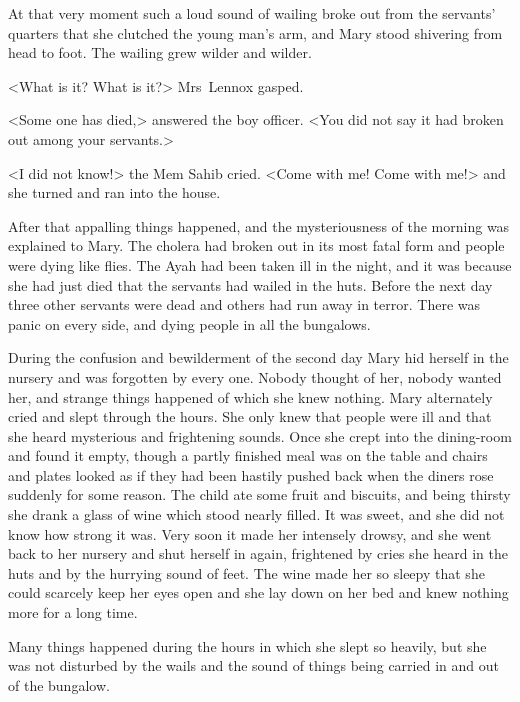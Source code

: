 At that very moment such a loud sound of wailing broke out from the servants' quarters that she clutched the young man's arm, and Mary stood shivering from head to foot. The wailing grew wilder and wilder.

<What is it? What is it?> Mrs~Lennox gasped.

<Some one has died,> answered the boy officer. <You did not say it had broken out among your servants.>

<I did not know!> the Mem Sahib cried. <Come with me! Come with me!> and she turned and ran into the house.

After that appalling things happened, and the mysteriousness of the morning was explained to Mary. The cholera had broken out in its most fatal form and people were dying like flies. The Ayah had been taken ill in the night, and it was because she had just died that the servants had wailed in the huts. Before the next day three other servants were dead and others had run away in terror. There was panic on every side, and dying people in all the bungalows.

During the confusion and bewilderment of the second day Mary hid herself in the nursery and was forgotten by every one. Nobody thought of her, nobody wanted her, and strange things happened of which she knew nothing. Mary alternately cried and slept through the hours. She only knew that people were ill and that she heard mysterious and frightening sounds. Once she crept into the dining-room and found it empty, though a partly finished meal was on the table and chairs and plates looked as if they had been hastily pushed back when the diners rose suddenly for some reason. The child ate some fruit and biscuits, and being thirsty she drank a glass of wine which stood nearly filled. It was sweet, and she did not know how strong it was. Very soon it made her intensely drowsy, and she went back to her nursery and shut herself in again, frightened by cries she heard in the huts and by the hurrying sound of feet. The wine made her so sleepy that she could scarcely keep her eyes open and she lay down on her bed and knew nothing more for a long time.

Many things happened during the hours in which she slept so heavily, but she was not disturbed by the wails and the sound of things being carried in and out of the bungalow.

